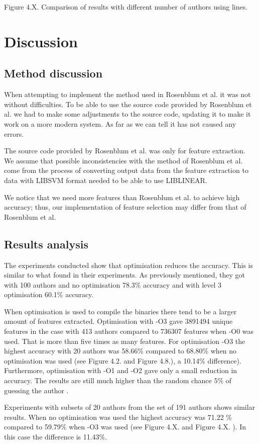 \documentclass[a4paper,11pt]{kth-mag}
\begin{document}
Figure 4.X. Comparison of results with different number of authors using lines.


\chapter{Discussion}
\section{Method discussion}
When attempting to implement the method used in Rosenblum et al. it was not
without difficulties. To be able to use the source code provided by Rosenblum
et al. we had to make some adjustments to the source code, updating it to make
it work on a more modern system. As far as we can tell it has not caused any
errors.

The source code provided by Rosenblum et al. was only for feature extraction.
We assume that possible inconsistencies with the method of Rosenblum et al.
come from the process of converting output data from the feature extraction to
data with LIBSVM format needed to be able to use LIBLINEAR.

We notice that we need more features than Rosenblum et al. to achieve high
accuracy; thus, our implementation of feature selection may differ from that of
Rosenblum et al. 

\section{Results analysis}
The experiments conducted show that optimisation reduces the accuracy. This is
similar to what \parencite{caliskan2015coding} found in their experiments. As
previously mentioned, they got with 100 authors and no optimisation 78.3\%
accuracy and with level 3 optimisation 60.1\% accuracy.

When optimisation is used to compile the binaries there tend to be a larger
amount of features extracted. Optimisation with -O3 gave 3891494 unique
features in the case with 413 authors compared to 736307 features when -O0 was
used. That is more than five times as many features. For optimisation -O3  the
highest accuracy with 20 authors was 58.66\% compared to 68.80\% when no
optimisation was used (see Figure 4.2. and Figure 4.8.), a 10.14\% difference).
Furthermore, optimisation with -O1 and -O2 gave only a small reduction in
accuracy. The results are still much higher than the random chance 5\% of
guessing the author . 

Experiments with subsets of 20 authors from the set of 191 authors shows
similar results. When no optimisation was used the highest accuracy was 71.22
\% compared to 59.79\% when -O3 was used (see Figure 4.X. and  Figure 4.X. ).
In this case the difference is 11.43\%.
\end{document}
